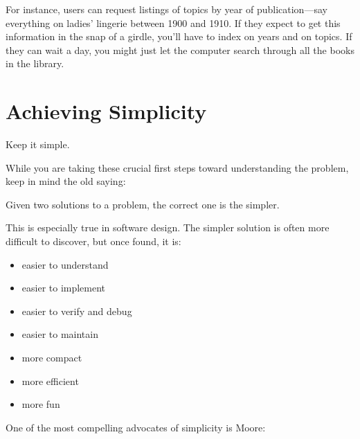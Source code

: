 For instance, users can request listings of topics by year of
publication---say everything on ladies' lingerie between 1900 and
1910.  If they expect to get this information in the snap of a girdle,
you'll have to index on years and on topics. If they can wait a day,
you might just let the computer search through all the books in the
library.

\section{Achieving Simplicity}

\begin{tip}
Keep it simple.
\end{tip}

\noindent While you are taking these crucial first steps toward
understanding the problem, keep in mind the old saying:

\begin{tfquot}
Given two solutions to a problem, the correct one is the simpler.
\end{tfquot}
This is especially true in software design. The simpler solution is often
more difficult to discover, but once found, it is:

\begin{itemize}
\item easier to understand
\item easier to implement
\item easier to verify and debug
\item easier to maintain
\item more compact
\item more efficient
\item more fun
\end{itemize}

\bigskip\blackline{2ex}
\noindent One of the most compelling advocates of simplicity is
Moore:

